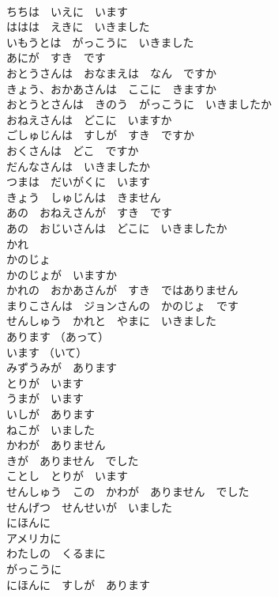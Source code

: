 \documentclass[8pt]{extreport}
\begin{document}
\begin{CJK}{UTF8}{min}
\\	ちちは　いえに　います	
\\	ははは　えきに　いきました	
\\	いもうとは　がっこうに　いきました	
\\	あにが　すき　です	
\\	おとうさんは　おなまえは　なん　ですか	
\\	きょう、おかあさんは　ここに　きますか	
\\	おとうとさんは　きのう　がっこうに　いきましたか	
\\	おねえさんは　どこに　いますか	
\\	ごしゅじんは　すしが　すき　ですか	
\\	おくさんは　どこ　ですか	
\\	だんなさんは　いきましたか	
\\	つまは　だいがくに　います	
\\	きょう　しゅじんは　きません	
\\	あの　おねえさんが　すき　です	
\\	あの　おじいさんは　どこに　いきましたか	
\\	かれ	
\\	かのじょ	
\\	かのじょが　いますか	
\\	かれの　おかあさんが　すき　ではありません	
\\	まりこさんは　ジョンさんの　かのじょ　です	
\\	せんしゅう　かれと　やまに　いきました	
\\	あります （あって）	
\\	います （いて）	
\\	みずうみが　あります	
\\	とりが　います	
\\	うまが　います	
\\	いしが　あります	
\\	ねこが　いました	
\\	かわが　ありません	
\\	きが　ありません　でした	
\\	ことし　とりが　います	
\\	せんしゅう　この　かわが　ありません　でした	
\\	せんげつ　せんせいが　いました	
\\	にほんに	
\\	アメリカに	
\\	わたしの　くるまに	
\\	がっこうに	
\\	にほんに　すしが　あります	

\end{CJK}
\end{document}
